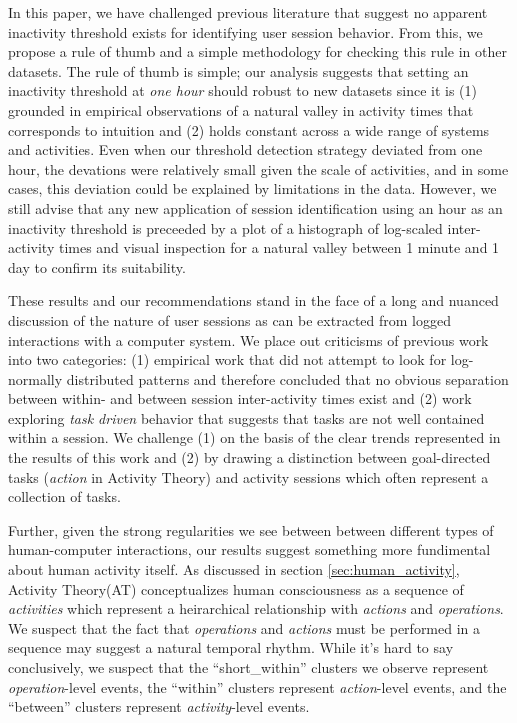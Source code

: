 In this paper, we have challenged previous literature that suggest no apparent inactivity threshold exists for identifying user session behavior.  From this, we propose a rule of thumb and a simple methodology for checking this rule in other datasets.  The rule of thumb is simple; our analysis suggests that setting an inactivity threshold at \emph{one hour} should robust to new datasets since it is (1) grounded in empirical observations of a natural valley in activity times that corresponds to intuition and (2) holds constant across a wide range of systems and activities. Even when our threshold detection strategy deviated from one hour, the devations were relatively small given the scale of activities, and in some cases, this deviation could be explained by limitations in the data.  However, we still advise that any new application of session identification using an hour as an inactivity threshold is preceeded by a plot of a histograph of log-scaled inter-activity times and visual inspection for a natural valley between 1 minute and 1 day to confirm its suitability.

These results and our recommendations stand in the face of a long and nuanced discussion of the nature of user sessions as can be extracted from logged interactions with a computer system.  We place out criticisms of previous work into two categories: (1) empirical work that did not attempt to look for log-normally distributed patterns and therefore concluded that no obvious separation between within- and between session inter-activity times exist\cite{something} and (2) work exploring \emph{task driven} behavior that suggests that tasks are not well contained within a session.  We challenge (1) on the basis of the clear trends represented in the results of this work and (2) by drawing a distinction between goal-directed tasks (\emph{action} in Activity Theory) and activity sessions which often represent a collection of tasks.

Further, given the strong regularities we see between between different types of human-computer interactions, our results suggest something more fundimental about human activity itself.  As discussed in section \ref{sec:human_activity}, Activity Theory(AT) conceptualizes human consciousness as a sequence of \emph{activities} which represent a heirarchical relationship with \emph{actions} and \emph{operations}.  We suspect that the fact that \emph{operations} and \emph{actions} must be performed in a sequence may suggest a natural temporal rhythm.  While it's hard to say conclusively, we suspect that the ``short\_within'' clusters we observe represent \emph{operation}-level events, the ``within'' clusters represent \emph{action}-level events, and the ``between'' clusters represent \emph{activity}-level events.

